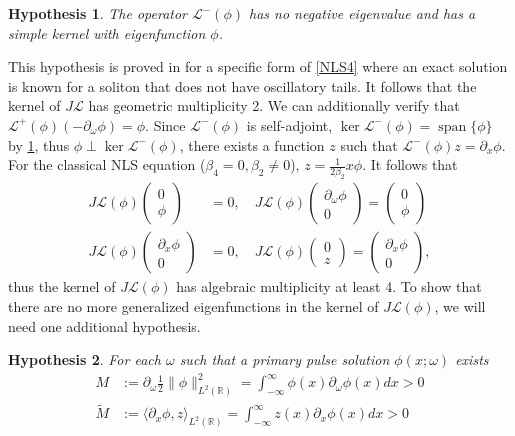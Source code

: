 \documentclass[12pt]{elsarticle}
\def\R{{\mathbb R}}
\def\calL{{\mathcal L}}
\DeclareMathOperator{\spn}{span}
\newtheorem{hypothesis}{Hypothesis}
\begin{document}
\begin{hypothesis}\label{hyp:Lminusspec}
The operator $\calL^-(\phi)$ has no negative eigenvalue and has a simple kernel with eigenfunction $\phi$.
\end{hypothesis}

This hypothesis is proved in \cite{Natali2015} for a specific form of \cref{NLS4} where an exact solution is known for a soliton that does not have oscillatory tails. It follows that the kernel of $J \calL$ has geometric multiplicity 2. We can additionally verify that $\calL^+(\phi)(-\partial_\omega \phi) = \phi$. Since $\calL^-(\phi)$ is self-adjoint, $\ker \calL^-(\phi) = \spn\{\phi\}$ by \cref{hyp:Lminusspec}, thus $\phi \perp \ker \calL^-(\phi)$, there exists a function $z$ such that $\calL^-(\phi) z = \partial_x \phi$. For the classical NLS equation ($\beta_4 = 0, \beta_2 \neq 0$), $z = \frac{1}{2 \beta_2} x \phi$. It follows that
\begin{equation}\label{Lphikernel}
\begin{aligned}
J \calL(\phi)\begin{pmatrix}0 \\ \phi \end{pmatrix} &= 0, \quad
J \calL(\phi)\begin{pmatrix} \partial_\omega \phi \\ 0 \end{pmatrix} = \begin{pmatrix}0 \\ \phi \end{pmatrix} \\
J \calL(\phi)\begin{pmatrix}\partial_x\phi \\ 0 \end{pmatrix} &= 0, \quad
J \calL(\phi)\begin{pmatrix} 0 \\ z \end{pmatrix} = \begin{pmatrix}\partial_x\phi \\ 0 \end{pmatrix},
\end{aligned}
\end{equation}
thus the kernel of $J \calL(\phi)$ has algebraic multiplicity at least 4. To show that there are no more generalized eigenfunctions in the kernel of $J \calL(\phi)$, we will need one additional hypothesis. 

\begin{hypothesis}\label{hyp:Mcond}
For each $\omega$ such that a primary pulse solution $\phi(x; \omega)$ exists
\begin{align}
M &:= \partial_\omega \frac{1}{2} \| \phi \|_{L^2(\R)}^2
= \int_{-\infty}^\infty \phi(x) \partial_\omega \phi(x) dx > 0 \label{eq:M} \\
\tilde{M} &:= \langle \partial_x \phi, z \rangle_{L^2(\R)} = \int_{-\infty}^\infty z(x) \partial_x \phi(x) dx > 0 \label{eq:tildeM}
\end{align}
\end{hypothesis}
\end{document}
